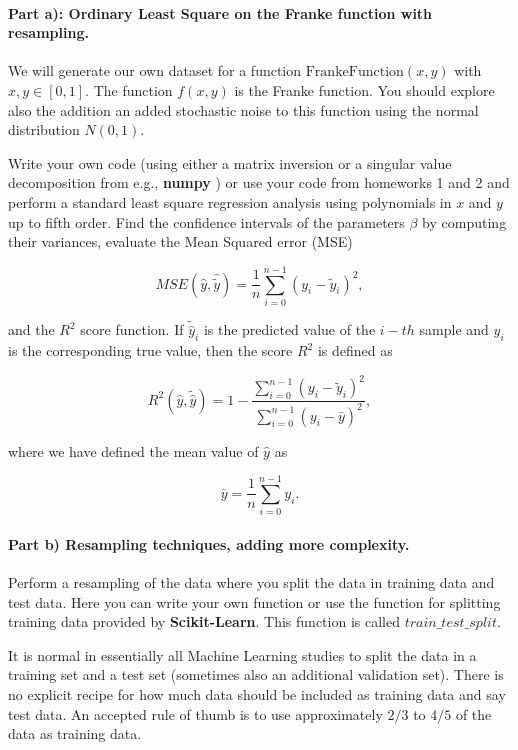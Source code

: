 \documentclass[%
oneside,                 %
final,                   %
10pt]{article}
\begin{document}
\paragraph{Part a): Ordinary Least Square on the Franke function  with resampling.}
We will generate our own dataset for a function
$\mathrm{FrankeFunction}(x,y)$ with $x,y \in [0,1]$. The function
$f(x,y)$ is the Franke function. You should explore also the addition
an added stochastic noise to this function using the normal
distribution $N(0,1)$.

Write your own code (using either a matrix inversion or a singular
value decomposition from e.g., \textbf{numpy} ) or use your code from
homeworks 1 and 2 and perform a standard least square regression
analysis using polynomials in $x$ and $y$ up to fifth order. Find the
confidence intervals of the parameters $\beta$ by computing their
variances, evaluate the Mean Squared error (MSE)

\[ MSE(\hat{y},\hat{\tilde{y}}) = \frac{1}{n}
\sum_{i=0}^{n-1}(y_i-\tilde{y}_i)^2, 
\] 

and the $R^2$ score function.  If $\tilde{\hat{y}}_i$ is the predicted
value of the $i-th$ sample and $y_i$ is the corresponding true value,
then the score $R^2$ is defined as

\[
R^2(\hat{y}, \tilde{\hat{y}}) = 1 - \frac{\sum_{i=0}^{n - 1} (y_i - \tilde{y}_i)^2}{\sum_{i=0}^{n - 1} (y_i - \bar{y})^2},
\]

where we have defined the mean value  of $\hat{y}$ as

\[
\bar{y} =  \frac{1}{n} \sum_{i=0}^{n - 1} y_i.
\]

\paragraph{Part b) Resampling techniques, adding more complexity.}
Perform a resampling of the data where you split the data in training
data and test data. Here you can write your own function or use the
function for splitting training data provided by \textbf{Scikit-Learn}.
This function is called $train\_test\_split$.

It is normal in essentially all Machine Learning studies to split the
data in a training set and a test set (sometimes also an additional
validation set).  There
is no explicit recipe for how much data should be included as training
data and say test data.  An accepted rule of thumb is to use
approximately $2/3$ to $4/5$ of the data as training data.
\end{document}
